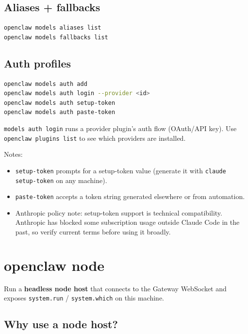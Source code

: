\subsection{Aliases + fallbacks}


\begin{lstlisting}[language=bash]
openclaw models aliases list
openclaw models fallbacks list
\end{lstlisting}


\subsection{Auth profiles}


\begin{lstlisting}[language=bash]
openclaw models auth add
openclaw models auth login --provider <id>
openclaw models auth setup-token
openclaw models auth paste-token
\end{lstlisting}


\texttt{models auth login} runs a provider plugin’s auth flow (OAuth/API key). Use
\texttt{openclaw plugins list} to see which providers are installed.

Notes:

\begin{itemize}
  \item \texttt{setup-token} prompts for a setup-token value (generate it with \texttt{claude setup-token} on any machine).
  \item \texttt{paste-token} accepts a token string generated elsewhere or from automation.
  \item Anthropic policy note: setup-token support is technical compatibility. Anthropic has blocked some subscription usage outside Claude Code in the past, so verify current terms before using it broadly.
\end{itemize}



\clearpage

\section{openclaw node}


Run a \textbf{headless node host} that connects to the Gateway WebSocket and exposes
\texttt{system.run} / \texttt{system.which} on this machine.

\subsection{Why use a node host?}


